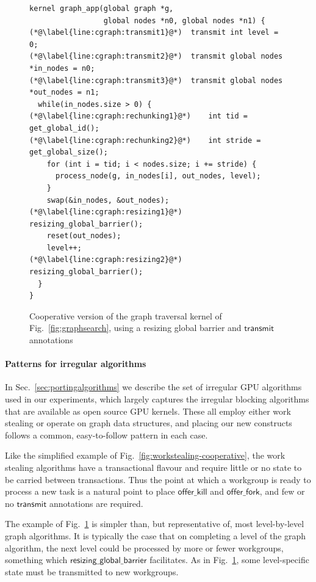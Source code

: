 \documentclass[numbers,nocopyrightspace,10pt]{sigplanconf}
\newcommand{\myfig}{Fig.~}
\newcommand{\mysec}{Sec.~}
\newcommand{\transmit}{\mathsf{transmit}}
\newcommand{\offerfork}{\mathsf{offer\_fork}}
\newcommand{\offerkill}{\mathsf{offer\_kill}}
\newcommand{\resizingglobalbarrier}{\mathsf{resizing\_global\_barrier}}
\begin{document}
\begin{figure}

\begin{lstlisting}
kernel graph_app(global graph *g, 
                 global nodes *n0, global nodes *n1) {
(*@\label{line:cgraph:transmit1}@*)  transmit int level = 0;
(*@\label{line:cgraph:transmit2}@*)  transmit global nodes *in_nodes = n0;
(*@\label{line:cgraph:transmit3}@*)  transmit global nodes *out_nodes = n1;
  while(in_nodes.size > 0) {
(*@\label{line:cgraph:rechunking1}@*)    int tid = get_global_id();
(*@\label{line:cgraph:rechunking2}@*)    int stride = get_global_size();
    for (int i = tid; i < nodes.size; i += stride) {
      process_node(g, in_nodes[i], out_nodes, level);
    }
    swap(&in_nodes, &out_nodes);
(*@\label{line:cgraph:resizing1}@*)    resizing_global_barrier();
    reset(out_nodes);
    level++;
(*@\label{line:cgraph:resizing2}@*)    resizing_global_barrier();
  }
}
\end{lstlisting}
\caption{Cooperative version of the graph traversal kernel of \myfig\ref{fig:graphsearch}, using a resizing global barrier and $\transmit$ annotations}\label{fig:cgraphsearch}
\end{figure}

\paragraph{Patterns for irregular algorithms}
In \mysec\ref{sec:portingalgorithms} we describe the set of irregular GPU algorithms used
in our experiments, which largely captures the irregular blocking
algorithms that are available as open source GPU kernels.  These all
employ either work stealing or operate on graph data structures, and placing our new constructs follows a common, easy-to-follow pattern in each case.

Like the simplified example of \myfig\ref{fig:workstealing-cooperative}, the work stealing algorithms have a transactional flavour
and require little or no state to be carried between transactions.  Thus the point at which a workgroup is ready to process a new task is a natural point to place $\offerkill$ and $\offerfork$, and few or no $\transmit$ annotations are required.

The example of \myfig\ref{fig:cgraphsearch} is simpler than, but representative of,
most level-by-level graph algorithms.
It is typically the case that on completing a level of
the graph algorithm, the next level could be processed by more or
fewer workgroups, something which $\resizingglobalbarrier$
facilitates.  As in \myfig\ref{fig:cgraphsearch}, some level-specific state must be transmitted to new workgroups.
\end{document}
